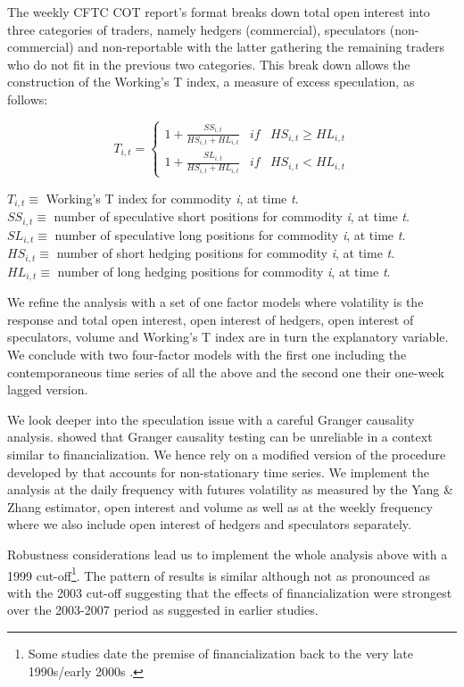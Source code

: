 \documentclass[
]{book}
\let\rmarkdownfootnote\footnote%
\def\footnote{\protect\rmarkdownfootnote}
\begin{document}
The weekly CFTC COT report's format breaks down total open interest into three categories of traders, namely hedgers (commercial), speculators (non-commercial) and non-reportable with the latter gathering the remaining traders who do not fit in the previous two categories. This break down allows the construction of the Working's T index, a measure of excess speculation, as follows:

\[
T_{i, t} =
\left\{\begin{matrix}
1+\frac{SS_{i, t}}{HS_{i, t}+HL_{i, t}} & if & HS_{i, t} \geq HL_{i, t}\\ 
1+\frac{SL_{i, t}}{HS_{i, t}+HL_{i, t}} & if & HS_{i, t} < HL_{i, t}
\end{matrix}\right.
\]

\(T_{i, t}\equiv\) Working's T index for commodity \textit{i}, at time \textit{t}.\\
\(SS_{i, t}\equiv\) number of speculative short positions for commodity \textit{i}, at time \textit{t}.\\
\(SL_{i, t}\equiv\) number of speculative long positions for commodity \textit{i}, at time \textit{t}.\\
\(HS_{i, t}\equiv\) number of short hedging positions for commodity \textit{i}, at time \textit{t}.\\
\(HL_{i, t}\equiv\) number of long hedging positions for commodity \textit{i}, at time \textit{t}.

We refine the analysis with a set of one factor models where volatility is the response and total open interest, open interest of hedgers, open interest of speculators, volume and Working's T index are in turn the explanatory variable. We conclude with two four-factor models with the first one including the contemporaneous time series of all the above and the second one their one-week lagged version.

We look deeper into the speculation issue with a careful Granger causality analysis. \citet{phillips_testing_1990} showed that Granger causality testing can be unreliable in a context similar to financialization. We hence rely on a modified version of the procedure developed by \citet{toda_statistical_1995} that accounts for non-stationary time series. We implement the analysis at the daily frequency with futures volatility as measured by the Yang \& Zhang estimator, open interest and volume as well as at the weekly frequency where we also include open interest of hedgers and speculators separately.

Robustness considerations lead us to implement the whole analysis above with a 1999 cut-off\footnote{Some studies date the premise of financialization back to the very late 1990s/early 2000s \citep{bohl_does_2013, stoll_commodity_2010, buyuksahin_speculators_2014}.}. The pattern of results is similar although not as pronounced as with the 2003 cut-off suggesting that the effects of financialization were strongest over the 2003-2007 period as suggested in earlier studies.
\end{document}
